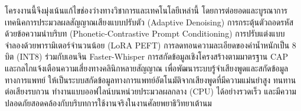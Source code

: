 โครงงานนี้จึงมุ่งเน้นแก้ไขช่องว่างทางวิชาการและเทคโนโลยีเหล่านี้ โดยการต่อยอดและบูรณาการเทคนิคการประมวลผลสัญญาณเสียงแบบปรับตัว (Adaptive Denoising) การกระตุ้นตัวถอดรหัสด้วยข้อความนำบริบท (Phonetic-Contrastive Prompt Conditioning) การปรับแต่งแบบจำลองด้วยพารามิเตอร์จำนวนน้อย (LoRA PEFT) การลดทอนความละเอียดของค่าน้ำหนักเป็น 8 บิต (INT8) ร่วมกับเอนจิน Faster-Whisper การสกัดข้อมูลเชิงโครงสร้างตามมาตรฐาน CAP และกลไกแจ้งเตือนความเสี่ยงทางคลินิกหลายสัญญาณ เพื่อพัฒนาระบบรู้จำเสียงพูดและสกัดข้อมูลทางการแพทย์ ให้เป็นระบบสกัดข้อมูลทางการแพทย์อัตโนมัติจากเสียงพูดที่มีความแม่นยำสูง ทนทานต่อเสียงรบกวน ทำงานแบบออฟไลน์บนหน่วยประมวลผลกลาง (CPU) ได้อย่างรวดเร็ว และมีความปลอดภัยสอดคล้องกับบริบทการใช้งานจริงในงานศัลยพยาธิวิทยาเต้านม